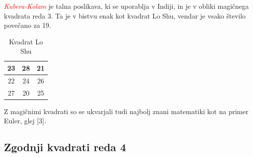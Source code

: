 \documentclass[a4paper,12pt]{article}
\begin{document}
\textcolor{red}{\emph{Kubera-Kolam}} je talna poslikava, ki se uporablja v Indiji, in je v
obliki magičnega kvadrata reda 3. Ta je v bistvu enak kot kvadrat
Lo Shu, vendar je vsako število povečano za 19.

%
\begin{table}[h]
   \begin{center}

   \caption{Kvadrat Lo Shu}
   \label{table:mag3}
   \begin{tabular}{|c|c|c|}
   \hline
   23 & 28 & 21 \\ \hline
   22 & 24 & 26 \\ \hline
   27 & 20 & 25 \\ \hline
   \end{tabular}
         
   \end{center}
\end{table}
%
Z magičnimi kvadrati so se ukvarjali tudi najbolj znani matematiki kot na
primer Euler, glej [3]. %


\subsection{Zgodnji kvadrati reda 4}
\end{document}
